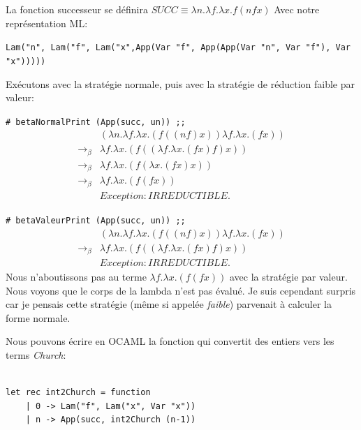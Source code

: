 \documentclass[11pt]{book}
\begin{document}
La fonction successeur se définira $SUCC \equiv \lambda n.\lambda f.\lambda x.f (n f x)$
Avec notre représentation ML: 

\verb+Lam("n", Lam("f", Lam("x",App(Var "f", App(App(Var "n", Var "f"), Var "x")))))+

Exécutons avec la stratégie normale, puis avec la stratégie de réduction faible par valeur:


\verb+# betaNormalPrint (App(succ, un)) ;;+
$$
\begin{array}{ll}
& (\lambda n . \lambda f . \lambda x . (f((nf)x))\lambda f . \lambda x . (fx))   \\
\rightarrow _\beta & \lambda f . \lambda x . (f((\lambda f . \lambda x . (fx)f)x))   \\
\rightarrow _\beta & \lambda f . \lambda x . (f(\lambda x . (fx)x))   \\
\rightarrow _\beta & \lambda f . \lambda x . (f(fx))   \\
& Exception: IRREDUCTIBLE.
\end{array}
$$

\verb+# betaValeurPrint (App(succ, un)) ;;+
$$
\begin{array}{ll}
& (\lambda n . \lambda f . \lambda x . (f((nf)x))\lambda f . \lambda x . (fx))   \\
\rightarrow _\beta & \lambda f . \lambda x . (f((\lambda f . \lambda x . (fx)f)x))   \\
& Exception: IRREDUCTIBLE.
\end{array} 
$$
Nous n'aboutissons pas au terme $\lambda f . \lambda x . (f(fx)) $ avec la stratégie par valeur. Nous voyons que le corps de la lambda
n'est pas évalué. Je suis cependant surpris car je pensais cette stratégie (même si appelée \textit{faible}) parvenait à calculer la
forme normale.

Nous pouvons écrire en OCAML la fonction qui convertit des entiers vers les terms \textit{Church}:
\begin{Verbatim}

let rec int2Church = function
	| 0 -> Lam("f", Lam("x", Var "x"))
	| n -> App(succ, int2Church (n-1))
\end{Verbatim}
\end{document}
